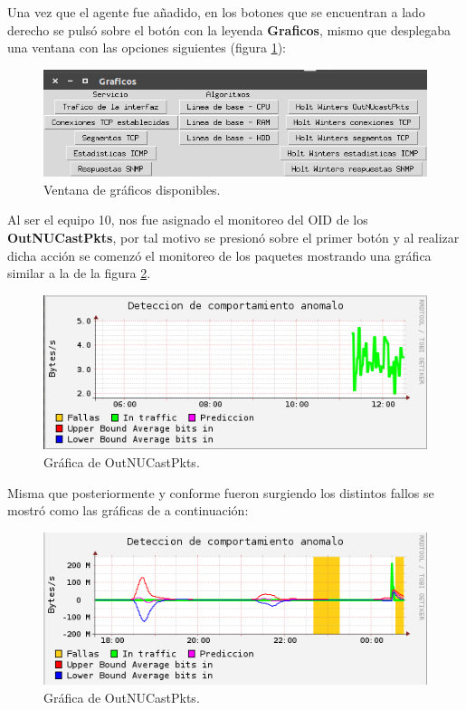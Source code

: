 Una vez que el agente fue añadido, en los botones que se encuentran a lado derecho se pulsó sobre el botón con la leyenda \textbf{Graficos}, mismo que desplegaba una ventana con las opciones siguientes (figura \ref{image:graficos}):
\FloatBarrier
\begin{figure}[htbp!]
		\centering
			\includegraphics[width=.8 \textwidth]{images/graficos}
		\caption{Ventana de gráficos disponibles.}
		\label{image:graficos}
\end{figure}
\FloatBarrier
Al ser el equipo 10, nos fue asignado el monitoreo del OID de los \textbf{OutNUCastPkts}, por tal motivo se presionó sobre el primer botón y al realizar dicha acción se comenzó el monitoreo de los paquetes mostrando una gráfica similar a la de la figura \ref{image:grafica1}.
\FloatBarrier
\begin{figure}[htbp!]
		\centering
			\includegraphics[width=.7 \textwidth]{images/grafica1}
		\caption{Gráfica de OutNUCastPkts.}
		\label{image:grafica1}
\end{figure}
\FloatBarrier
Misma que posteriormente y conforme fueron surgiendo los distintos fallos se mostró como las gráficas de a continuación:
\FloatBarrier
\begin{figure}[htbp!]
		\centering
			\includegraphics[width=.7 \textwidth]{images/grafica2}
		\caption{Gráfica de OutNUCastPkts.}
		\label{image:grafica2}
\end{figure}
\FloatBarrier

